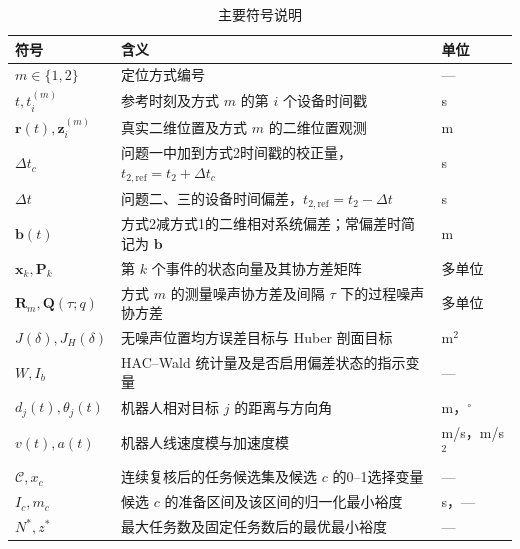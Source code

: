 \begin{table}[htbp]
  \centering
  \caption{主要符号说明}
  \label{tab:symbols}
  \begin{tabular}{>{\centering\arraybackslash}p{}p{}>{\centering\arraybackslash}p{}}
    \toprule[1.5pt]
    符号 & 含义 & 单位 \\
    \midrule[1pt]
    $m\in\{1,2\}$ & 定位方式编号 & --- \\
    $t,t_i^{(m)}$ & 参考时刻及方式 $m$ 的第 $i$ 个设备时间戳 & s \\
    $\mathbf r(t),\mathbf z_i^{(m)}$ & 真实二维位置及方式 $m$ 的二维位置观测 & m \\
    $\Delta t_c$ & 问题一中加到方式2时间戳的校正量，$t_{2,\mathrm{ref}}=t_2+\Delta t_c$ & s \\
    $\Delta t$ & 问题二、三的设备时间偏差，$t_{2,\mathrm{ref}}=t_2-\Delta t$ & s \\
    $\mathbf b(t)$ & 方式2减方式1的二维相对系统偏差；常偏差时简记为 $\mathbf b$ & m \\
    $\mathbf x_k,\mathbf P_k$ & 第 $k$ 个事件的状态向量及其协方差矩阵 & 多单位 \\
    $\mathbf R_m,\mathbf Q(\tau;q)$ & 方式 $m$ 的测量噪声协方差及间隔 $\tau$ 下的过程噪声协方差 & 多单位 \\
    $J(\delta),J_H(\delta)$ & 无噪声位置均方误差目标与 Huber 剖面目标 & m$^2$ \\
    $W,I_b$ & HAC--Wald 统计量及是否启用偏差状态的指示变量 & --- \\
    $d_j(t),\theta_j(t)$ & 机器人相对目标 $j$ 的距离与方向角 & m，$^\circ$ \\
    $v(t),a(t)$ & 机器人线速度模与加速度模 & m/s，m/s$^2$ \\
    $\mathcal C,x_c$ & 连续复核后的任务候选集及候选 $c$ 的0--1选择变量 & --- \\
    $I_c,m_c$ & 候选 $c$ 的准备区间及该区间的归一化最小裕度 & s，--- \\
    $N^*,z^*$ & 最大任务数及固定任务数后的最优最小裕度 & --- \\
    \bottomrule[1.5pt]
  \end{tabular}
\end{table}
